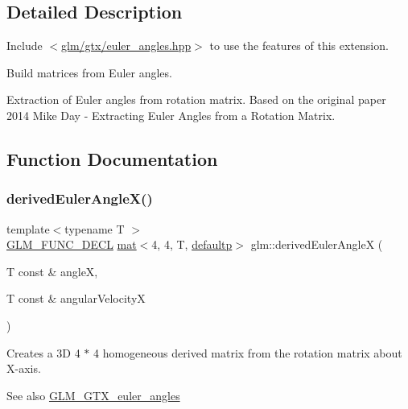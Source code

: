 \subsection{Detailed Description}
Include $<$\hyperlink{euler__angles_8hpp}{glm/gtx/euler\+\_\+angles.\+hpp}$>$ to use the features of this extension.

Build matrices from Euler angles.

Extraction of Euler angles from rotation matrix. Based on the original paper 2014 Mike Day -\/ Extracting Euler Angles from a Rotation Matrix. 

\subsection{Function Documentation}
\mbox{\label{group__gtx__euler__angles_ga994b8186b3b80d91cf90bc403164692f}} 
\subsubsection{\texorpdfstring{derived\+Euler\+Angle\+X()}{derivedEulerAngleX()}}
{\footnotesize\ttfamily template$<$typename T $>$ \\
\hyperlink{setup_8hpp_ab2d052de21a70539923e9bcbf6e83a51}{G\+L\+M\+\_\+\+F\+U\+N\+C\+\_\+\+D\+E\+CL} \hyperlink{structglm_1_1mat}{mat}$<$4, 4, T, \hyperlink{namespaceglm_a36ed105b07c7746804d7fdc7cc90ff25a9d21ccd8b5a009ec7eb7677befc3bf51}{defaultp}$>$ glm\+::derived\+Euler\+AngleX (\begin{DoxyParamCaption}\item[{T const \&}]{angleX,  }\item[{T const \&}]{angular\+VelocityX }\end{DoxyParamCaption})}

Creates a 3D 4 $\ast$ 4 homogeneous derived matrix from the rotation matrix about X-\/axis. \begin{DoxySeeAlso}{See also}
\hyperlink{group__gtx__euler__angles}{G\+L\+M\+\_\+\+G\+T\+X\+\_\+euler\+\_\+angles} 
\end{DoxySeeAlso}
\mbox{\label{group__gtx__euler__angles_ga0a4c56ecce7abcb69508ebe6313e9d10}} 
